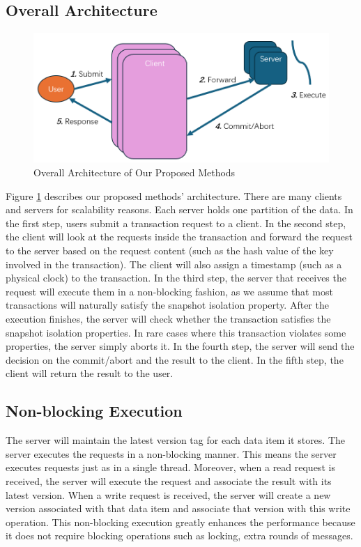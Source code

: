 \subsection{Overall Architecture}
\begin{figure}[H]
    \centering
    \includegraphics[width=0.8\linewidth]{figure/overall.png}
    \caption{Overall Architecture of Our Proposed Methods}
    \label{fig:overall}
\end{figure}

Figure \ref{fig:overall} describes our proposed methods' architecture. There are many clients and servers for scalability reasons. Each server holds one partition of the data. In the first step, users submit a transaction request to a client. In the second step, the client will look at the requests inside the transaction and forward the request to the server based on the request content (such as the hash value of the key involved in the transaction). The client will also assign a timestamp (such as a physical clock) to the transaction. In the third step, the server that receives the request will execute them in a non-blocking fashion, as we assume that most transactions will naturally satisfy the snapshot isolation property. After the execution finishes, the server will check whether the transaction satisfies the snapshot isolation properties. In rare cases where this transaction violates some properties, the server simply aborts it. In the fourth step, the server will send the decision on the commit/abort and the result to the client. In the fifth step, the client will return the result to the user.
\subsection{Non-blocking Execution}

The server will maintain the latest version tag for each data item it stores. 
The server executes the requests in a non-blocking manner. This means the server executes requests just as in a single thread. Moreover, when a read request is received, the server will execute the request and associate the result with its latest version. When a write request is received, the server will create a new version associated with that data item and associate that version with this write operation. This non-blocking execution greatly enhances the performance because it does not require blocking operations such as locking, extra rounds of messages.


